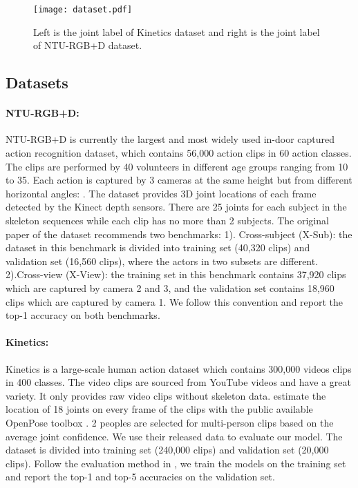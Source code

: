 \documentclass[10pt,twocolumn,letterpaper]{article}
\begin{document}
	\begin{figure}[!htb]
	\begin{center}
	\texttt{[image: dataset.pdf]}
	\caption{Left is the joint label of Kinetics dataset and right is the joint label of NTU-RGB+D dataset.}
	\label{fig:dataset}	
	\end{center}
	\end{figure}

    \subsection{Datasets}
    \paragraph{NTU-RGB+D:} NTU-RGB+D \cite{shahroudy_ntu_2016} is currently the largest and most widely used in-door captured action recognition dataset, which contains 56,000 action clips in 60 action classes. The clips are performed by 40 volunteers in different age groups ranging from 10 to 35. Each action is captured by 3 cameras at the same height but from different horizontal angles: . The dataset provides 3D joint locations of each frame detected by the Kinect depth sensors. There are 25 joints for each subject in the skeleton sequences while each clip has no more than 2 subjects. The original paper \cite{shahroudy_ntu_2016} of the dataset recommends two benchmarks: 
    1). Cross-subject (X-Sub): the dataset in this benchmark is divided into training set (40,320 clips) and validation set (16,560 clips), where the actors in two subsets are different.
    2).Cross-view (X-View): the training set in this benchmark contains 37,920 clips which are captured by camera 2 and 3, and the validation set contains 18,960 clips which are captured by camera 1.
    We follow this convention and report the top-1 accuracy on both benchmarks.
    
    \paragraph{Kinetics:} Kinetics \cite{kay_kinetics_2017} is a large-scale human action dataset which contains 300,000 videos clips in 400 classes. The video clips are sourced from YouTube videos and have a great variety. It only provides raw video clips without skeleton data. \cite{yan_spatial_2018} estimate the location of 18 joints on every frame of the clips with the public available OpenPose toolbox \cite{cao_realtime_2017}. 2 peoples are selected for multi-person clips based on the average joint confidence. We use their released data to evaluate our model. The dataset is divided into training set (240,000 clips) and validation set (20,000 clips). Follow the evaluation method in \cite{kay_kinetics_2017}, we train the models on the training set and report the top-1 and top-5 accuracies on the validation set.
	
\end{document}

